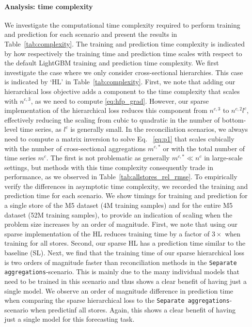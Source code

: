 \documentclass[preprint, 3p, times, twocolumn]{elsarticle}
\begin{document}
  \paragraph{Analysis: time complexity} \label{par:timecomplexity} We investigate the computational time complexity required to perform training and prediction for each scenario and present the results in Table~\ref{tab:complexity}. The training and prediction time complexity is indicated by how respectively the training time and prediction time scales with respect to the default LightGBM training and prediction time complexity. We first investigate the case where we only consider cross-sectional hierarchies. This case is indicated by `HL' in Table~\ref{tab:complexity}. First, we note that adding our hierarchical loss objective adds a component to the time complexity that scales with \(n^{c,3}\), as we need to compute \eqref{eq:hfp_grad}. However, our sparse implementation of the hierarchical loss reduces this component from \(n^{c,3}\) to \(n^{c,2}l^c\), effectively reducing the scaling from cubic to quadratic in the number of bottom-level time series, as \(l^c\) is generally small. In the reconciliation scenarios, we always need to compute a matrix inversion to solve Eq.~ \eqref{eq:p1} that scales cubically with the number of cross-sectional aggregations \(m^{c,*}\) or with the total number of time series \(m^c\). The first is not problematic as generally \(m^{c,*} \ll n^c\) in large-scale settings, but methods with this time complexity consequently trade in performance, as we observed in Table~\ref{tab:allstores_rel_rmse}. To empirically verify the differences in asymptotic time complexity, we recorded the training and prediction time for each scenario. We show timings for training and prediction for a single store of the M5 dataset (4M training samples) and for the entire M5 dataset (52M training samples), to provide an indication of scaling when the problem size increases by an order of magnitude. First, we note that using our sparse implementation of the HL reduces training time by a factor of \(3\times\) when training for all stores. Second, our sparse HL has a prediction time similar to the baseline (SL). 
  Next, we find that the training time of our sparse hierarchical loss is two orders of magnitude faster than reconciliation methods in the \texttt{Separate aggregations}-scenario. This is mainly due to the many individual models that need to be trained in this scenario and thus shows a clear benefit of having just a single model. We observe an order of magnitude difference in prediction time when comparing the sparse hierarchical loss to the \texttt{Separate aggregations}-scenario when predictinf all stores. Again, this shows a clear benefit of having just a single model for this forecasting task. 
\end{document}
